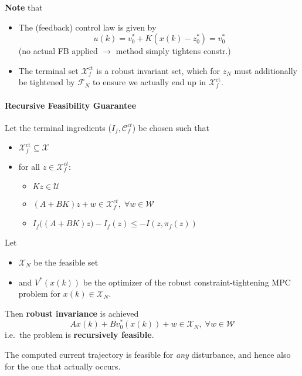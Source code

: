 \textbf{Note} that
\begin{itemize}
    \item The (feedback) control law is given by
          \begin{equation*}
              u(k) = v_0^* + K(x(k) - z_0^*) = v_0^*
          \end{equation*}
          (no actual FB applied $\rightarrow$ method simply tightens constr.)
    \item The terminal set $\mathcal{X}_f^{\mathrm{ct}}$ is a robust invariant set, which for $z_{N}$ must additionally be tightened by $\mathcal{F}_N$ to ensure we actually end up in $\mathcal{X}_f^{\mathrm{ct}}$.
\end{itemize}

\paragraph{Recursive Feasibility Guarantee}

Let the terminal ingredients ($I_f, \mathcal{C}_f^{ct}$) be chosen such that
\begin{itemize}
    \item $\mathcal{X}_f^{\mathrm{ct}}\subseteq \mathcal{X}$
    \item for all $z\in \mathcal{X}_f^{ct}$:
          \begin{itemize}
              \item $Kz \in \mathcal{U}$
              \item $(A+BK) z + w \in \mathcal{X}_f^{ct}, \; \forall w \in \mathcal{W}$
              \item $I_f\bigl((A+BK)z\bigr) - I_f(z) \leq -I(z, \pi_f(z))$
          \end{itemize}
\end{itemize}
\newpar{}
Let
\begin{itemize}
    \item $\mathcal{X}_N$ be the feasible set
    \item and $V^*(x(k))$ be the optimizer of the robust constraint-tightening MPC problem for $x(k)\in\mathcal{X}_N$.
\end{itemize}
\newpar{}
Then \textbf{robust invariance} is achieved
\begin{equation*}
    Ax(k) + Bv_0^*(x(k)) + w \in \mathcal{X}_N, \; \forall w \in \mathcal{W}
\end{equation*}
i.e.\ the problem is \textbf{recursively feasible}.
\newpar{}

The computed current trajectory is feasible for \textit{any} disturbance, and hence also for the one that actually occurs.

